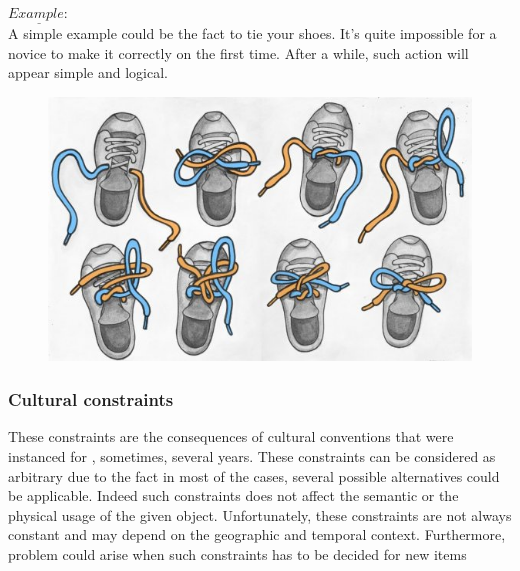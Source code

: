 \documentclass[a4paper,11pt] {article}
\theoremstyle{definition}
\begin{document}
        $\underline{Example:}$\\
        A simple example could be the fact to tie your shoes. It's quite impossible for a novice to make it correctly on the first time. After a while, such action will appear simple and logical.
        \begin{figure}[h]
        \centering
        \includegraphics[scale=0.3]{fig-report/tie_your_shoes.jpg}
        \end{figure}
        \subsubsection{Cultural constraints}        
        These constraints are the consequences of cultural conventions that were instanced for , sometimes, 	several years. These constraints can be considered as arbitrary due to the fact in most of the cases, several possible alternatives could be applicable. Indeed such constraints does not affect the semantic or the physical usage of the given object. Unfortunately, these constraints are not always constant and may depend on the geographic and temporal context. Furthermore, problem could arise when such constraints has to be decided for new items\\
       
\end{document}
